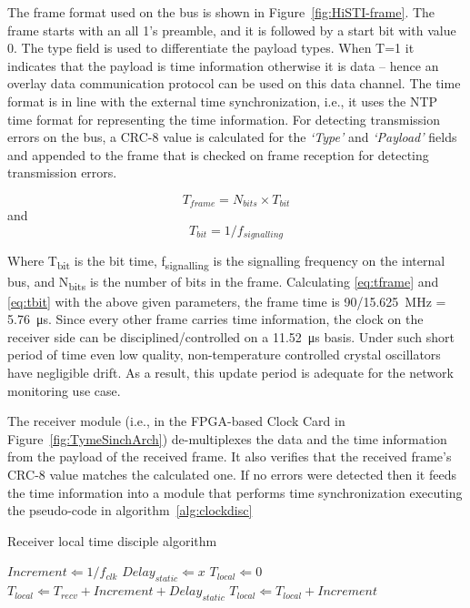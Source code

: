 \documentclass[journal]{IEEEtran}
\begin{document}
The frame format used on the bus is shown in Figure~\ref{fig:HiSTI-frame}. The frame starts with an all 1's preamble, and it is
followed by a start bit with value 0. The type field is used to differentiate the payload types. When T=1 it
indicates that the payload is
time information otherwise it is data -- hence an overlay data communication protocol can be used on this data channel.
The time format is in line with the external time synchronization, i.e., it uses the NTP
time format for representing the time information. For detecting transmission errors on the bus, a CRC-8 value is
calculated
for the \emph{`Type'} and \emph{`Payload'} fields and appended to the frame that is checked on frame reception for
detecting
transmission errors.

\begin{equation}\label{eq:tframe}
T_{frame} = N_{bits} \times T_{bit}
\end{equation}
and
\begin{equation}\label{eq:tbit}
T_{bit} = 1/f_{signalling}
\end{equation}

Where T\textsubscript{bit} is the bit time, f\textsubscript{signalling} is the signalling frequency on the internal bus, and N\textsubscript{bits} is the number of bits in the frame.
Calculating \eqref{eq:tframe} and \eqref{eq:tbit} with the above given parameters, the frame time is 90/\SI{15.625}{\mega\hertz} = \SI{5.76}{\micro\second}. Since every
other frame carries time information, the clock on the receiver side can be disciplined/controlled on a
\SI{11.52}{\micro\second}
basis. Under such short period of time even low quality, non-temperature controlled crystal oscillators have negligible
drift.
As a result, this update period is adequate for the network monitoring use case.

The receiver module (i.e., in the FPGA-based Clock Card in Figure~\ref{fig:TymeSinchArch}) de-multiplexes the data and the time information from the payload of the received frame. 
It also verifies that the received frame's CRC-8 value matches the calculated one. If no errors were detected then it feeds the
time information into a module that performs time synchronization executing the pseudo-code in algorithm~\ref{alg:clockdisc}

\begin{algorithm} %
\caption{Receiver local time disciple algorithm} %
\label{alg:clockdisc} %
\begin{algorithmic} %
    \STATE $Increment \Leftarrow 1/f_{clk}$
    \STATE $Delay_{static} \Leftarrow x$ 
    \STATE $T_{local} \Leftarrow 0$
            \STATE $T_{local} \Leftarrow T_{recv} + Increment + Delay_{static}$
        \ELSE
            \STATE $T_{local} \Leftarrow T_{local} + Increment$
        \ENDIF
    \ENDFOR
\end{algorithmic}
\end{algorithm}
\end{document}
